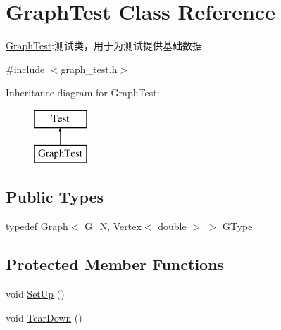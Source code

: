 \hypertarget{class_graph_test}{}\section{Graph\+Test Class Reference}
\label{class_graph_test}


\hyperlink{class_graph_test}{Graph\+Test}\+:测试类，用于为测试提供基础数据  




{\ttfamily \#include $<$graph\+\_\+test.\+h$>$}

Inheritance diagram for Graph\+Test\+:\begin{figure}[H]
\begin{center}
\leavevmode
\includegraphics[height=2.000000cm]{class_graph_test}
\end{center}
\end{figure}
\subsection*{Public Types}
\begin{DoxyCompactItemize}
\item 
typedef \hyperlink{struct_introduction_to_algorithm_1_1_graph_algorithm_1_1_graph}{Graph}$<$ G\+\_\+\+N, \hyperlink{struct_introduction_to_algorithm_1_1_graph_algorithm_1_1_vertex}{Vertex}$<$ double $>$ $>$ \hyperlink{class_graph_test_a35200ea3d08690769c40550cba2ecd5a}{G\+Type}
\end{DoxyCompactItemize}
\subsection*{Protected Member Functions}
\begin{DoxyCompactItemize}
\item 
void \hyperlink{class_graph_test_a2f0d213d11ea0b8245c526379674b91b}{Set\+Up} ()
\item 
void \hyperlink{class_graph_test_a53c606b64363a694f425a844dfabc08e}{Tear\+Down} ()
\end{DoxyCompactItemize}
